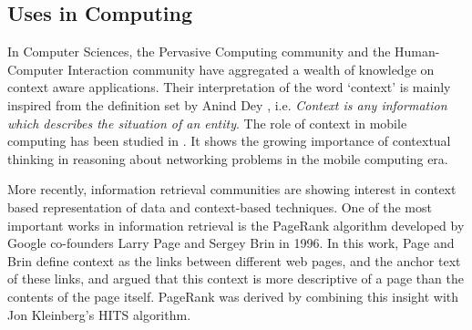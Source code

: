 \subsection{Uses in Computing}
In Computer Sciences, the Pervasive Computing community and the Human-Computer Interaction community have aggregated a wealth of knowledge on context aware applications. Their interpretation of the word `context' is mainly inspired from the definition set by Anind Dey \cite{dey2001understanding}, i.e. \emph{Context is any information which describes the situation of an entity}. The role of context in mobile computing has been studied in \cite{chen2000survey}. It shows the growing importance of contextual thinking in reasoning about networking problems in the mobile computing era. 

More recently, information retrieval communities are showing interest in context based representation of data and context-based techniques. One of the most important works in information retrieval is the PageRank algorithm \cite{page1999pagerank} developed by Google co-founders Larry Page and Sergey Brin in 1996. In this work, Page and Brin define context as the links between different web pages, and the anchor text of these links, and argued that this context is more descriptive of a page than the contents of the page itself. PageRank was derived by combining this insight with Jon Kleinberg's HITS \cite{kleinberg1999authoritative} algorithm.

